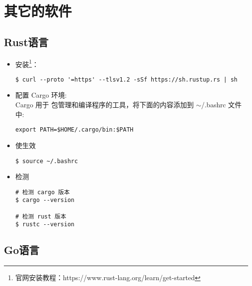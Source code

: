 \chapter{其它的软件}
\section{Rust语言}

\begin{itemize}
\item 安装\footnote{官网安装教程：https://www.rust-lang.org/learn/get-started}：
\begin{lstlisting}
$ curl --proto '=https' --tlsv1.2 -sSf https://sh.rustup.rs | sh
\end{lstlisting}
	
\item 配置 Cargo 环境:\\ 
Cargo 用于 包管理和编译程序的工具，将下面的内容添加到 $ \sim $/.bashrc 文件中: \\ 
\begin{lstlisting}
export PATH=$HOME/.cargo/bin:$PATH
\end{lstlisting}
	
\item 使生效
\begin{lstlisting}
$ source ~/.bashrc
\end{lstlisting}

\item 检测
\begin{lstlisting}
# 检测 cargo 版本
$ cargo --version

# 检测 rust 版本
$ rustc --version 
\end{lstlisting}
\end{itemize}
\newpage

\section{Go语言}

